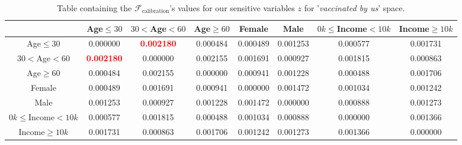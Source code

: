 \documentclass{article}
\begin{document}
\begin{center}
\begin{table}[H]
\begin{adjustbox}{max width=\textwidth}
    \begin{tabular}{ |c| c c c c c c c|}
    \hline
      & Age$\leq30$ &    $30<$Age$<60$ &     Age$\geq60$ &    Female &      Male &   $0k\leq$Income$<10k$ &    Income$\geq10k$  \\
    \hline
     Age$\leq30$ &  0.000000 &  \textbf{\textcolor{red}{0.002180}} &  0.000484 &  0.000489 &  0.001253 &  0.000577 &  0.001731 \\
    \hline
    $30<$Age$<60$ &  \textbf{\textcolor{red}{0.002180}} &  0.000000 &  0.002155 &  0.001691 &  0.000927 &  0.001815 &  0.000863 \\
    \hline
    Age$\geq60$ &  0.000484 &  0.002155 &  0.000000 &  0.000941 &  0.001228 &  0.000488 &  0.001706 \\
    \hline
    Female &  0.000489 &  0.001691 &  0.000941 &  0.000000 &  0.001472 &  0.001034 &  0.001242 \\
    \hline
    Male &  0.001253 &  0.000927 &  0.001228 &  0.001472 &  0.000000 &  0.000888 &  0.001273 \\
    \hline
    $0k\leq$Income$<10k$ &  0.000577 &  0.001815 &  0.000488 &  0.001034 &  0.000888 &  0.000000 &  0.001366 \\
    \hline
    Income$\geq10k$ &  0.001731 &  0.000863 &  0.001706 &  0.001242 &  0.001273 &  0.001366 &  0.000000 
    \\ \hline
    \end{tabular}
    \end{adjustbox}
\caption{Table containing the $\mathcal{F}_{\text{calibration}}$'s values for our sensitive variables $z$ for '\textit{vaccinated by us}' space.}
\label{tab:15}
\end{table}
\end{center}
\end{document}
